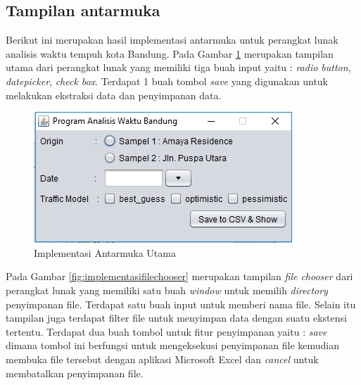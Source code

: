 \subsection{Tampilan antarmuka}
\label{subsec:tampilanantarmuka}

Berikut ini merupakan hasil implementasi antarmuka untuk perangkat lunak analisis waktu tempuh kota Bandung.
Pada Gambar \ref{fig:implementasiantarmukautama} merupakan tampilan utama dari perangkat lunak yang memiliki tiga buah input yaitu : \textit{radio button}, \textit{datepicker}, \textit{check box}. Terdapat 1 buah tombol \textit{save} yang digunakan untuk melakukan ekstraksi data dan penyimpanan data.

\begin{figure}[H]
				\centering		
				\includegraphics[scale=0.7]{Gambar/gui1.png}
				\caption[Implementasi Antarmuka Utama]{Implementasi Antarmuka Utama}
				\label{fig:implementasiantarmukautama}	
			\end{figure}
			
Pada Gambar \ref{fig:implementasifilechooser} merupakan tampilan \textit{file chooser} dari perangkat lunak yang memiliki satu buah \textit{window} untuk memilih \textit{directory} penyimpanan file. Terdapat satu buah input untuk memberi nama file. Selain itu tampilan juga terdapat filter file untuk menyimpan data dengan suatu ekstensi tertentu. Terdapat dua buah tombol untuk fitur penyimpanan yaitu : \textit{save} dimana tombol ini berfungsi untuk mengeksekusi penyimpanan file kemudian membuka file tersebut dengan aplikasi Microsoft Excel dan \textit{cancel} untuk membatalkan penyimpanan file.


